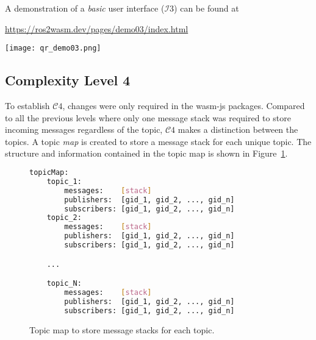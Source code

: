         \begin{tcolorbox}[title=Example 6]
            \begin{minipage}[t]{0.87\linewidth}
                \vspace*{0.5\baselineskip}
                A demonstration of a \textit{basic} user interface ($\mathcal{I}3$) can be found at 
                
                \href{https://ros2wasm.dev/pages/demo03/index.html}{\textsf{https://ros2wasm.dev/pages/demo03/index.html}}
            \end{minipage}\hfill%
            \begin{minipage}[t]{0.1\linewidth}
                \vspace*{0pt}
                \texttt{[image: qr\_demo03.png]}
            \end{minipage}
        \end{tcolorbox}



        \subsection{Complexity Level 4}

        To establish $\mathcal{C}4$, changes were only required in the \textsf{wasm-js} packages. Compared to all the previous levels where only one message stack was required to store incoming messages regardless of the topic, $\mathcal{C}4$ makes a distinction between the topics. A topic \textit{map} is created to store a message stack for each unique topic. The structure and information contained in the topic map is shown in Figure~\ref{fig:topicMap}.

        \begin{figure}[htbp]
            \centering
            \begin{lstlisting}[language=Bash]
topicMap:
    topic_1:
        messages:    [stack]
        publishers:  [gid_1, gid_2, ..., gid_n]
        subscribers: [gid_1, gid_2, ..., gid_n]
    topic_2:
        messages:    [stack]
        publishers:  [gid_1, gid_2, ..., gid_n]
        subscribers: [gid_1, gid_2, ..., gid_n]

    ...

    topic_N:
        messages:    [stack]
        publishers:  [gid_1, gid_2, ..., gid_n]
        subscribers: [gid_1, gid_2, ..., gid_n]
\end{lstlisting}
            \caption{Topic map to store message stacks for each topic.}
            \label{fig:topicMap}
        \end{figure}

